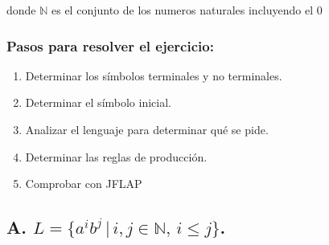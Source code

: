 \documentclass{article}
\begin{document}
        \begin{flushleft}
            donde $\mathbb{N}$ es el conjunto de los numeros naturales incluyendo el 0
        \end{flushleft}


        \vspace{\baselineskip} %


        \begin{flushleft}
            
            \subsubsection*{Pasos para resolver el ejercicio:}
                        
            \begin{enumerate}
                \item Determinar los símbolos terminales y no terminales.
                \item Determinar el símbolo inicial.
                \item Analizar el lenguaje para determinar qué se pide.
                \item Determinar las reglas de producción.
                \item Comprobar con JFLAP  
            \end{enumerate}
        \end{flushleft}


        \newpage


        \subsection*{A. $L = \{a^i b^j \, | \, i, j \in \mathbb{N}, \, i \leq j\}$.}
\end{document}
